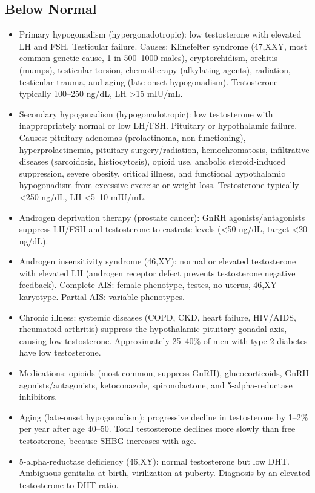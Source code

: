 \subsection*{Below Normal}
\begin{itemize}
  \item Primary hypogonadism (hypergonadotropic): low testosterone with elevated LH and FSH. Testicular failure. Causes: Klinefelter syndrome (47,XXY, most common genetic cause, 1 in 500--1000 males), cryptorchidism, orchitis (mumps), testicular torsion, chemotherapy (alkylating agents), radiation, testicular trauma, and aging (late-onset hypogonadism). Testosterone typically 100--250 ng/dL, LH >15 mIU/mL.
  \item Secondary hypogonadism (hypogonadotropic): low testosterone with inappropriately normal or low LH/FSH. Pituitary or hypothalamic failure. Causes: pituitary adenomas (prolactinoma, non-functioning), hyperprolactinemia, pituitary surgery/radiation, hemochromatosis, infiltrative diseases (sarcoidosis, histiocytosis), opioid use, anabolic steroid-induced suppression, severe obesity, critical illness, and functional hypothalamic hypogonadism from excessive exercise or weight loss. Testosterone typically <250 ng/dL, LH <5--10 mIU/mL.
  \item Androgen deprivation therapy (prostate cancer): GnRH agonists/antagonists suppress LH/FSH and testosterone to castrate levels (<50 ng/dL, target <20 ng/dL).
  \item Androgen insensitivity syndrome (46,XY): normal or elevated testosterone with elevated LH (androgen receptor defect prevents testosterone negative feedback). Complete AIS: female phenotype, testes, no uterus, 46,XY karyotype. Partial AIS: variable phenotypes.
  \item Chronic illness: systemic diseases (COPD, CKD, heart failure, HIV/AIDS, rheumatoid arthritis) suppress the hypothalamic-pituitary-gonadal axis, causing low testosterone. Approximately 25--40\% of men with type 2 diabetes have low testosterone.
  \item Medications: opioids (most common, suppress GnRH), glucocorticoids, GnRH agonists/antagonists, ketoconazole, spironolactone, and 5-alpha-reductase inhibitors.
  \item Aging (late-onset hypogonadism): progressive decline in testosterone by 1--2\% per year after age 40--50. Total testosterone declines more slowly than free testosterone, because SHBG increases with age.
  \item 5-alpha-reductase deficiency (46,XY): normal testosterone but low DHT. Ambiguous genitalia at birth, virilization at puberty. Diagnosis by an elevated testosterone-to-DHT ratio.
\end{itemize}

